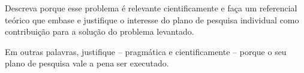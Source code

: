 
Descreva porque esse problema é relevante cientificamente e faça um referencial teórico que embase e justifique o interesse do plano de pesquisa individual como contribuição para a solução do problema levantado.

Em outras palavras, justifique -- pragmática e cientificamente -- porque o seu plano de pesquisa vale a pena ser executado.